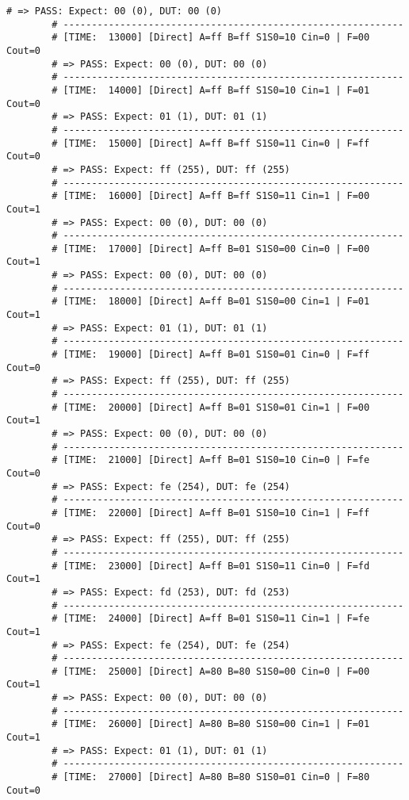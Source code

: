 \begin{itemize}[label=-]
\begin{lstlisting}[style=StyleResult, language=Result, caption={Kết quả mô phỏng Directed Test.}]
		# => PASS: Expect: 00 (0), DUT: 00 (0)
		# ------------------------------------------------------------
		# [TIME:  13000] [Direct] A=ff B=ff S1S0=10 Cin=0 | F=00 Cout=0
		# => PASS: Expect: 00 (0), DUT: 00 (0)
		# ------------------------------------------------------------
		# [TIME:  14000] [Direct] A=ff B=ff S1S0=10 Cin=1 | F=01 Cout=0
		# => PASS: Expect: 01 (1), DUT: 01 (1)
		# ------------------------------------------------------------
		# [TIME:  15000] [Direct] A=ff B=ff S1S0=11 Cin=0 | F=ff Cout=0
		# => PASS: Expect: ff (255), DUT: ff (255)
		# ------------------------------------------------------------
		# [TIME:  16000] [Direct] A=ff B=ff S1S0=11 Cin=1 | F=00 Cout=1
		# => PASS: Expect: 00 (0), DUT: 00 (0)
		# ------------------------------------------------------------
		# [TIME:  17000] [Direct] A=ff B=01 S1S0=00 Cin=0 | F=00 Cout=1
		# => PASS: Expect: 00 (0), DUT: 00 (0)
		# ------------------------------------------------------------
		# [TIME:  18000] [Direct] A=ff B=01 S1S0=00 Cin=1 | F=01 Cout=1
		# => PASS: Expect: 01 (1), DUT: 01 (1)
		# ------------------------------------------------------------
		# [TIME:  19000] [Direct] A=ff B=01 S1S0=01 Cin=0 | F=ff Cout=0
		# => PASS: Expect: ff (255), DUT: ff (255)
		# ------------------------------------------------------------
		# [TIME:  20000] [Direct] A=ff B=01 S1S0=01 Cin=1 | F=00 Cout=1
		# => PASS: Expect: 00 (0), DUT: 00 (0)
		# ------------------------------------------------------------
		# [TIME:  21000] [Direct] A=ff B=01 S1S0=10 Cin=0 | F=fe Cout=0
		# => PASS: Expect: fe (254), DUT: fe (254)
		# ------------------------------------------------------------
		# [TIME:  22000] [Direct] A=ff B=01 S1S0=10 Cin=1 | F=ff Cout=0
		# => PASS: Expect: ff (255), DUT: ff (255)
		# ------------------------------------------------------------
		# [TIME:  23000] [Direct] A=ff B=01 S1S0=11 Cin=0 | F=fd Cout=1
		# => PASS: Expect: fd (253), DUT: fd (253)
		# ------------------------------------------------------------
		# [TIME:  24000] [Direct] A=ff B=01 S1S0=11 Cin=1 | F=fe Cout=1
		# => PASS: Expect: fe (254), DUT: fe (254)
		# ------------------------------------------------------------
		# [TIME:  25000] [Direct] A=80 B=80 S1S0=00 Cin=0 | F=00 Cout=1
		# => PASS: Expect: 00 (0), DUT: 00 (0)
		# ------------------------------------------------------------
		# [TIME:  26000] [Direct] A=80 B=80 S1S0=00 Cin=1 | F=01 Cout=1
		# => PASS: Expect: 01 (1), DUT: 01 (1)
		# ------------------------------------------------------------
		# [TIME:  27000] [Direct] A=80 B=80 S1S0=01 Cin=0 | F=80 Cout=0

\end{lstlisting}
\end{itemize}

